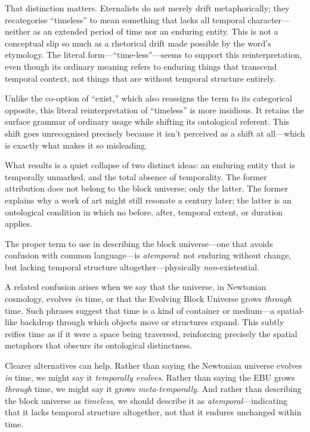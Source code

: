 \documentclass[12pt]{book}
\begin{document}
That distinction matters. Eternalists do not merely drift metaphorically; they recategorise ``timeless'' to mean something that lacks all temporal character---neither as an extended period of time nor an enduring entity. This is not a conceptual slip so much as a rhetorical drift made possible by the word's etymology. The literal form---``time-less''---seems to support this reinterpretation, even though its ordinary meaning refers to enduring things that transcend temporal context, not things that are without temporal structure entirely.

Unlike the co-option of ``exist,'' which also reassigns the term to its categorical opposite, this literal reinterpretation of ``timeless'' is more insidious. It retains the surface grammar of ordinary usage while shifting its ontological referent. This shift goes unrecognised precisely because it isn't perceived as a shift at all---which is exactly what makes it so misleading. 

What results is a quiet collapse of two distinct ideas: an enduring entity that is temporally unmarked, and the total absence of temporality. The former attribution does not belong to the block universe; only the latter. The former explains why a work of art might still resonate a century later; the latter is an ontological condition in which no before, after, temporal extent, or duration applies. 

The proper term to use in describing the block universe---one that avoids confusion with common language---is \textit{atemporal}: not enduring without change, but lacking temporal structure altogether---physically \textit{non}-existential.

A related confusion arises when we say that the universe, in Newtonian cosmology, evolves \textit{in} time, or that the Evolving Block Universe grows \textit{through} time. Such phrases suggest that time is a kind of container or medium---a spatial-like backdrop through which objects move or structures expand. This subtly reifies time as if it were a space being traversed, reinforcing precisely the spatial metaphors that obscure its ontological distinctness.

Clearer alternatives can help. Rather than saying the Newtonian universe evolves \textit{in} time, we might say it \textit{temporally evolves}. Rather than saying the EBU grows \textit{through} time, we might say it grows \textit{meta-temporally}. And rather than describing the block universe as \textit{timeless}, we should describe it as \textit{atemporal}---indicating that it lacks temporal structure altogether, not that it endures unchanged within time.
\end{document}
